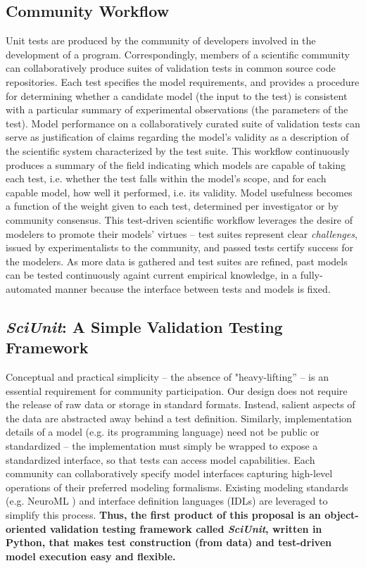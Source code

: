 \documentclass[11pt,letterpaper]{article}
\begin{document}
\subsection{Community Workflow}
Unit tests are produced by the community of developers involved in the development of a program. Correspondingly, members of a scientific community can collaboratively produce suites of validation tests in common source code repositories. Each test specifies the model requirements, and provides a procedure for determining whether a candidate model (the input to the test) is consistent with a particular summary of experimental observations (the parameters of the test). Model performance on a collaboratively curated suite of validation tests can serve as justification of claims regarding the model's validity as a description of the scientific system characterized by the test suite. This workflow continuously produces a summary of the field indicating which models are capable of taking each test, i.e. whether the test falls within the model's scope, and for each capable model, how well it performed, i.e. its validity.  Model usefulness becomes a function of the weight given to each test, determined per investigator or by community consensus. This test-driven scientific workflow leverages the desire of modelers to promote their models' virtues -- test suites represent clear \emph{challenges}, issued by experimentalists to the community, and passed tests certify success for the modelers. As more data is gathered and test suites are refined, past models can be tested continuously againt current empirical knowledge, in a fully-automated manner because the interface between tests and models is fixed.  

\subsection{\textit{SciUnit}: A Simple Validation Testing Framework}
Conceptual and practical simplicity -- the absence of "heavy-lifting'' -- is an essential requirement for community participation. Our design does not require the release of raw data or storage in standard formats. Instead, salient aspects of the data are abstracted away behind a test definition. Similarly, implementation details of a model (e.g. its programming language) need not be public or standardized -- the implementation must simply be wrapped to expose a standardized interface, so that tests can access model capabilities. Each community can collaboratively specify model interfaces capturing high-level operations of their preferred modeling formalisms. Existing modeling standards (e.g. NeuroML \cite{neuroml_url,gleeson_neuroml:_2010}) and interface definition languages (IDLs) \cite{bachmann2008} are leveraged to simplify this process. \textbf{Thus, the first product of this proposal is an object-oriented validation testing framework called \textit{SciUnit}, written in Python, that makes test construction (from data) and test-driven model execution easy and flexible.} 
\end{document}
